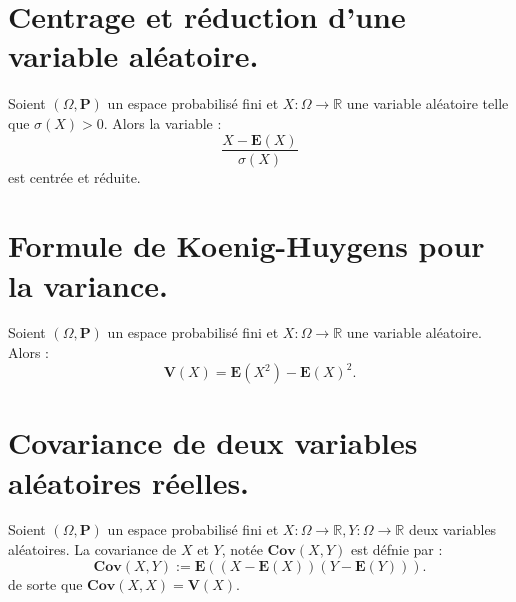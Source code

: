 \documentclass{article}
\begin{document}
\section{Centrage et réduction d'une variable aléatoire.}
Soient $(\Omega, \mathbf{P})$ un espace probabilisé fini et $X : \Omega \longrightarrow \mathbb{R}$ une variable aléatoire telle que $\sigma(X) > 0$. Alors la variable : 
\[
    \dfrac{X - \mathbf{E}(X)}{\sigma(X)}
\]
est centrée et réduite.

\section{Formule de Koenig-Huygens pour la variance.}
Soient $(\Omega, \mathbf{P})$ un espace probabilisé fini et $X : \Omega \longrightarrow \mathbb{R}$ une variable aléatoire. Alors : 
\[
    \mathbf{V}(X) = \mathbf{E}(X^2) - \mathbf{E}(X)^2.
\]

\section{Covariance de deux variables aléatoires réelles.}
Soient $(\Omega, \mathbf{P})$ un espace probabilisé fini et $X : \Omega \longrightarrow \mathbb{R}, Y : \Omega \longrightarrow \mathbb{R}$ deux variables aléatoires. La covariance de $X$ et $Y$, notée $\mathbf{Cov}(X, Y)$ est défnie par : 
\[
    \mathbf{Cov}(X, Y) := \mathbf{E}((X - \mathbf{E}(X))(Y - \mathbf{E}(Y))). 
\]
de sorte que $\mathbf{Cov}(X,X) = \mathbf{V}(X)$. 
\end{document}
